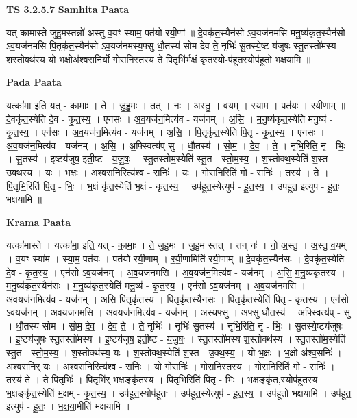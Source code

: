 \documentclass[17pt]{extarticle}
\begin{document}
\textbf{TS 3.2.5.7 } \newline
\textbf{Samhita Paata} \newline

यत् का॑मास्ते जुहु॒मस्तन्नो॑ अस्तु व॒यꣳ स्या॑म॒ पत॑यो रयी॒णां ॥ दे॒वकृ॑त॒स्यैन॑सो ऽव॒यज॑नमसि मनु॒ष्य॑कृत॒स्यैन॑सो ऽव॒यज॑नमसि पि॒तृकृ॑त॒स्यैन॑सो ऽव॒यज॑नमस्य॒फ्सु धौ॒तस्य॑ सोम देव ते॒ नृभिः॑ सु॒तस्ये॒ष्ट य॑जुषः स्तु॒तस्तो॑मस्य श॒स्तोक्थ॑स्य॒ यो भ॒क्षोअ॑श्व॒सनि॒र्यो गो॒सनि॒स्तस्य॑ ते पि॒तृभि॑र्भ॒क्षं कृ॑त॒स्यो-प॑हूत॒स्योप॑हूतो भक्षयामि ॥ \newline

\textbf{Pada Paata} \newline

यत्का॑मा॒ इति॒ यत् - का॒माः॒ । ते॒ । जु॒हु॒मः । तत् । नः॒ । अ॒स्तु॒ । व॒यम् । स्या॒म॒ । पत॑यः । र॒यी॒णाम् ॥ दे॒वकृ॑त॒स्येति॑ दे॒व - कृ॒त॒स्य॒ । एन॑सः । अ॒व॒यज॑न॒मित्य॑व - यज॑नम् । अ॒सि॒ । म॒नु॒ष्य॑कृत॒स्येति॑ मनु॒ष्य॑ - कृ॒त॒स्य॒ । एन॑सः । अ॒व॒यज॑न॒मित्य॑व - यज॑नम् । अ॒सि॒ । पि॒तृकृ॑त॒स्येति॑ पि॒तृ - कृ॒त॒स्य॒ । एन॑सः । अ॒व॒यज॑न॒मित्य॑व - यज॑नम् । अ॒सि॒ । अ॒फ्स्वित्य॑प्-सु । धौ॒तस्य॑ । सो॒म॒ । दे॒व॒ । ते॒ । नृभि॒रिति॒ नृ - भिः॒ । सु॒तस्य॑ । इ॒ष्टय॑जुष॒ इती॒ष्ट - य॒जु॒षः॒ । स्तु॒तस्तो॑म॒स्येति॑ स्तु॒त - स्तो॒म॒स्य॒ । श॒स्तोक्थ॒स्येति॑ श॒स्त - उ॒क्थ॒स्य॒ । यः । भ॒क्षः । अ॒श्व॒सनि॒रित्य॑श्व - सनिः॑ । यः । गो॒सनि॒रिति॑ गो - सनिः॑ । तस्य॑ । ते॒ । पि॒तृभि॒रिति॑ पि॒तृ - भिः॒ । भ॒क्षं कृ॑त॒स्येति॑ भ॒क्षं - कृ॒त॒स्य॒ । उप॑हूत॒स्येत्युप॑ - हू॒त॒स्य॒ । उप॑हूत॒ इत्युप॑ - हू॒तः॒ । भ॒क्ष॒या॒मि॒ ॥  \newline


\textbf{Krama Paata} \newline

यत्का॑मास्ते । यत्का॑मा॒ इति॒ यत् - का॒माः॒ । ते॒ जु॒हु॒मः । जु॒हु॒म स्तत् । तन् नः॑ । नो॒ अ॒स्तु॒ । अ॒स्तु॒ व॒यम् । व॒यꣳ स्या॑म । स्या॒म॒ पत॑यः । पत॑यो रयी॒णाम् । र॒यी॒णामिति॑ रयी॒णाम् ॥ दे॒वकृ॑त॒स्यैन॑सः । दे॒वकृ॑त॒स्येति॑ दे॒व - कृ॒त॒स्य॒ । एन॑सो ऽव॒यज॑नम् । अ॒व॒यज॑नमसि । अ॒व॒यज॑न॒मित्य॑व - यज॑नम् । अ॒सि॒ म॒नु॒ष्य॑कृतस्य । म॒नु॒ष्य॑कृत॒स्यैन॑सः । म॒नु॒ष्य॑कृत॒स्येति॑ मनु॒ष्य॑ - कृ॒त॒स्य॒ । एन॑सो ऽव॒यज॑नम् । अ॒व॒यज॑नमसि । अ॒व॒यज॑न॒मित्य॑व - यज॑नम् । अ॒सि॒ पि॒तृकृ॑तस्य । पि॒तृकृ॑त॒स्यैन॑सः । पि॒तृकृ॑त॒स्येति॑ पि॒तृ - कृ॒त॒स्य॒ । एन॑सो ऽव॒यज॑नम् । अ॒व॒यज॑नमसि । अ॒व॒यज॑न॒मित्य॑व - यज॑नम् । अ॒स्य॒फ्सु । अ॒फ्सु धौ॒तस्य॑ । अ॒फ्स्वित्य॑प् - सु । धौ॒तस्य॑ सोम । सो॒म॒ दे॒व॒ । दे॒व॒ ते॒ । ते॒ नृभिः॑ । नृभिः॑ सु॒तस्य॑ । नृभि॒रिति॒ नृ - भिः॒ । सु॒तस्ये॒ष्टय॑जुषः । इ॒ष्टय॑जुषः स्तु॒तस्तो॑मस्य । इ॒ष्टय॑जुष॒ इती॒ष्ट - य॒जु॒षः॒ । स्तु॒तस्तो॑मस्य श॒स्तोक्थ॑स्य । स्तु॒तस्तो॑म॒स्येति॑ स्तु॒त - स्तो॒म॒स्य॒ । श॒स्तोक्थ॑स्य॒ यः । श॒स्तोक्थ॒स्येति॑ श॒स्त - उ॒क्थ॒स्य॒ । यो भ॒क्षः । भ॒क्षो अ॑श्व॒सनिः॑ । अ॒श्व॒सनि॒र् यः । अ॒श्व॒सनि॒रित्य॑श्व - सनिः॑ । यो गो॒सनिः॑ । गो॒सनि॒स्तस्य॑ । गो॒सनि॒रिति॑ गो - सनिः॑ । तस्य॑ ते । ते॒ पि॒तृभिः॑ । पि॒तृभि॑र् भ॒क्षङ्कृ॑तस्य । पि॒तृभि॒रिति॑ पि॒तृ - भिः॒ । भ॒क्षङ्कृ॑त॒,स्योप॑हूतस्य । भ॒क्षङ्कृ॑त॒स्येति॑ भ॒क्षम् - कृ॒त॒स्य॒ । उप॑हूत॒स्योप॑हूतः । उप॑हूत॒स्येत्युप॑ - हू॒त॒स्य॒ । उप॑हूतो भक्षयामि । उप॑हूत॒ इत्युप॑ - हू॒तः॒ । भ॒क्ष॒या॒मीति॑ भक्षयामि । \newline
\end{document}
